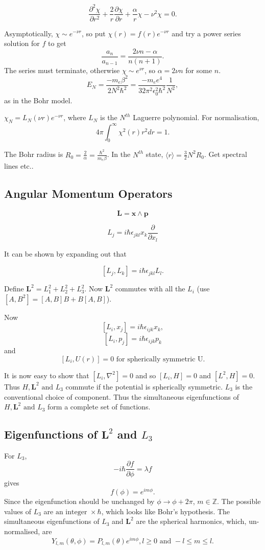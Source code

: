 \documentclass[a4paper]{article}
\newcommand{\Z}{\mathbb{Z}}
\newcommand{\eps}{\epsilon_0}
\newcommand{\pd}[2]{\frac{\partial #1}{\partial #2}}
\newcommand{\mom}{\mathbf{p}}
\newcommand{\posn}{\mathbf{x}}
\newcommand{\amom}{\mathbf{L}}
\newcommand{\com}[2]{\left[ #1,#2 \right]}
\begin{document}
\[
\pd{^2 \chi}{r^2} + \frac{2}{r}\pd{\chi}{r} + \frac{\alpha}{r} \chi - 
\nu^2 \chi = 0.
\]

Asymptotically, $\chi \sim e^{-\nu r}$, so put $\chi(r) = f(r) e^{-\nu r}$ and
try a power series solution for $f$ to get
\[
\frac{a_n}{a_{n-1}} = \frac{2 \nu n - \alpha}{n(n+1)}.
\]
The series must terminate, otherwise $\chi \sim e^{\nu r}$, so $\alpha = 2 \nu n$ for some $n$.
\[
E_N = \frac{-m_e \beta^2}{2 N^2 \hbar^2} =
\frac{-m_e e^4}{32 \pi^2 \eps^2 \hbar^2} \frac{1}{N^2},
\]
as in the Bohr model.

$\chi_N = L_N(\nu r)e^{- \nu r}$, where $L_N$ is the $N^{th}$ Laguerre polynomial.  For normalisation,
\[
4 \pi \int_0^\infty \chi^2(r) r^2 dr = 1.
\]

The Bohr radius is $R_0 = \frac{2}{\alpha} = \frac{\hbar^2}{m_e \beta}$.  In
the $N^{th}$ state, $\langle r \rangle = \frac{3}{2}N^2 R_0$.  Get spectral
lines etc..

\subsection{Angular Momentum Operators}

\[
\amom = \posn \wedge \mom
\]

\[
L_j = i \hbar \epsilon_{jkl}x_k \pd{}{x_l}
\]

It can be shown by expanding out that

\[
\com{L_j}{L_k} = i \hbar \epsilon_{jkl}L_l.
\]

Define $\amom^2 = L_1^2 + L_2^2 + L_3^2$.  Now $\amom^2$ commutes with all
the $L_i$ (use $\com{A}{B^2}=\com{A}{B}B + B\com{A}{B}$).

Now
\[
\com{L_i}{x_j} = i \hbar \epsilon_{ijk}x_k,
\]
\[
\com{L_i}{p_j} = i \hbar \epsilon_{ijk}p_k
\]
and
\[
\com{L_i}{U(r)} = 0 \text{ for spherically symmetric U.}
\]

It is now easy to show that $\com{L_i}{\nabla^2} = 0$ and so $\com{L_i}{H} = 0$
and $\com{L^2}{H} = 0$.  Thus $H, \amom^2 \text{ and } L_3$ commute if the
potential is spherically symmetric.  $L_3$ is the conventional choice of
component.  Thus the simultaneous eigenfunctions of $H, \amom^2 
\text{ and } L_3$ form a complete set of functions.

\subsection{Eigenfunctions of $\amom^2$ and $L_3$}

For $L_3$,
\[
-i \hbar \pd{f}{\phi} = \lambda f
\]
gives 
\[
f(\phi) = e^{i m \phi}.
\]
Since the eigenfunction should be unchanged by $\phi \rightarrow \phi + 2 \pi$,
$m \in \Z$.  The possible values of $L_3$ are $\text{an integer }\times \hbar$,
which looks like Bohr's hypothesis.  The simultaneous eigenfunctions of $L_3$
and $\amom^2$ are the spherical harmonics, which, un-normalised, are
\[
Y_{l,m}(\theta,\phi) = P_{l,m}(\theta)e^{i m \phi}, l \ge 0 \text{ and }
-l \le m \le l.
\]
\end{document}
